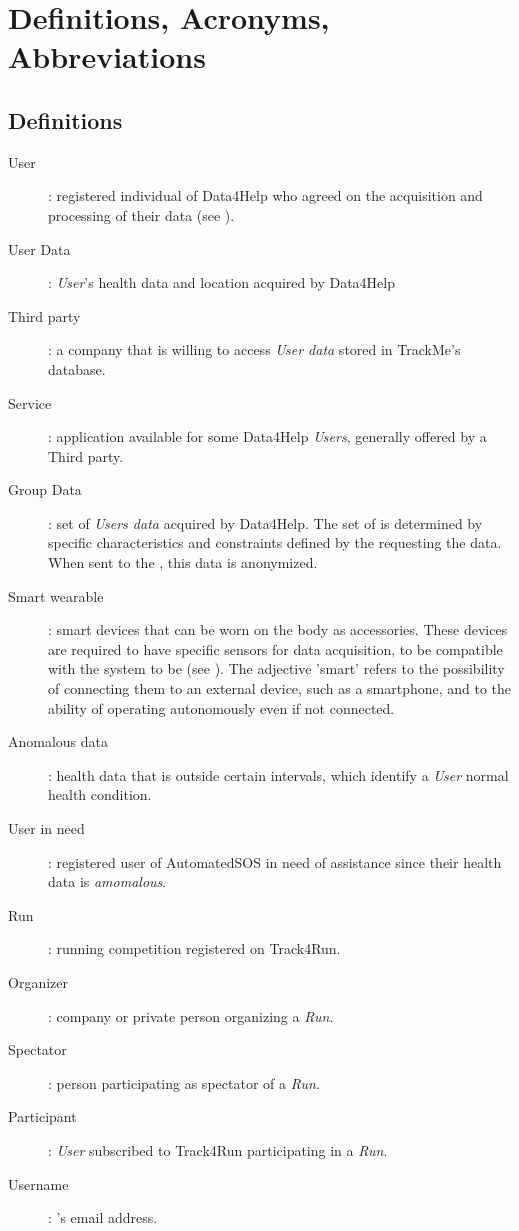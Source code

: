 \documentclass[../../rasd.tex]{subfiles}
\begin{document}
\section{Definitions, Acronyms, Abbreviations}
		\subsection{Definitions}
		\begin{description}
			\item[User]: registered individual of Data4Help who agreed on the acquisition and processing of their data (see ).
			\item[User Data]: \textit{User}'s health data and location acquired by Data4Help
			\item[Third party]: a company that is willing to access \textit{User data} stored in TrackMe's database.
			\item[Service]: application available for some Data4Help \textit{Users}, generally offered by a Third party.
			\item[Group Data]: set of \textit{Users data} acquired by Data4Help. The set of  is determined by specific characteristics and constraints defined by the  requesting the data. When sent to the , this data is anonymized.
			\item[Smart wearable]: smart devices that can be worn on the body as accessories. These devices are required to have specific sensors for data acquisition, to be compatible with the system to be (see ). The adjective 'smart' refers to the possibility of connecting them to an external device, such as a smartphone, and to the ability of operating autonomously even if not connected.
			\item[Anomalous data]: health data that is outside certain intervals, which identify a \textit{User} normal health condition. 
			\item[User in need]: registered user of AutomatedSOS in need of assistance since their health data is \textit{amomalous}.
			\item[Run]: running competition registered on Track4Run. 
			\item[Organizer]: company or private person organizing a \textit{Run}.
			\item[Spectator]: person participating as spectator of a \textit{Run}.
			\item[Participant]: \textit{User} subscribed to Track4Run participating in a \textit{Run}.
			\item[Username]: 's email address.


		\end{description}
\end{document}
